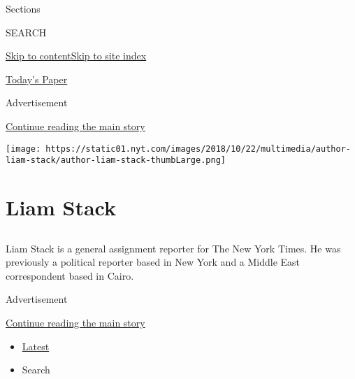 Sections

SEARCH

\protect\hyperlink{site-content}{Skip to
content}\protect\hyperlink{site-index}{Skip to site index}

\href{https://myaccount.nytimes.com/auth/login?response_type=cookie\&client_id=vi}{}

\href{https://www.nytimes.com/section/todayspaper}{Today's Paper}

Advertisement

\protect\hyperlink{after-top}{Continue reading the main story}

\texttt{[image: https://static01.nyt.com/images/2018/10/22/multimedia/author-liam-stack/author-liam-stack-thumbLarge.png]}

\hypertarget{liam-stack}{%
\section{Liam Stack}\label{liam-stack}}

\subsection{}

Liam Stack is a general assignment reporter for The New York Times. He
was previously a political reporter based in New York and a Middle East
correspondent based in Cairo.

Advertisement

\protect\hyperlink{after-mid1}{Continue reading the main story}

\begin{itemize}
\tightlist
\item
  \protect\hyperlink{stream-panel}{Latest}
\item
  Search
\end{itemize}

